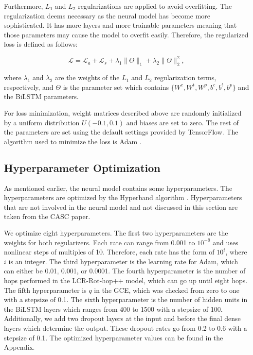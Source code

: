 \documentclass[american, oneside]{ecsgdp}
\begin{document}
Furthermore, $L_1$ and $L_2$ regularizations are applied to avoid overfitting. The regularization deems necessary as the neural model has become more sophisticated. It has more layers and more trainable parameters meaning that those parameters may cause the model to overfit easily. Therefore, the regularized loss is defined as follows:

\begin{equation}
    \mathcal{L} = \mathcal{L}_a + \mathcal{L}_s + \lambda_1 \|\Theta\|_1 + \lambda_2  \|\Theta\|^2_2,
\end{equation}

\noindent where $\lambda_1$ and $\lambda_2$ are the weights of the $L_1$ and $L_2$ regularization terms, respectively, and $\Theta$ is the parameter set which contains $\{W^c, W^t, W^p, b^c, b^t, b^p\}$ and the BiLSTM parameters.

For loss minimization, weight matrices described above are randomly initialized by a uniform distribution $U(-0.1, 0.1)$ and biases are set to zero. The rest of the parameters are set using the default settings provided by TensorFlow. The algorithm used to minimize the loss is Adam \parencite{Kingma2017Adam}. %

\subsection{Hyperparameter Optimization} \label{sec:hypertune}
As mentioned earlier, the neural model contains some hyperparameters. The hyperparameters are optimized by the Hyperband algorithm \parencite{Li2018Hyperband}. %
Hyperparameters that are not involved in the neural model and not discussed in this section are taken from the CASC \parencite{Kumar2021CASC} paper.

We optimize eight hyperparameters. The first two hyperparameters are the weights for both regularizers. Each rate can range from 0.001 to $10^{-9}$ and uses nonlinear steps of multiples of 10. Therefore, each rate has the form of $10^{i}$, where $i$ is an integer. The third hyperparameter is the learning rate for Adam, which can either be 0.01, 0.001, or 0.0001. The fourth hyperparameter is the number of hops performed in the LCR-Rot-hop++ model, which can go up until eight hops. The fifth hyperparameter is $q$ in the GCE, which was checked from zero to one with a stepsize of 0.1. The sixth hyperparameter is the number of hidden units in the BiLSTM layers which ranges from  400 to 1500 with a stepsize of 100. Additionally, we add two dropout layers at the input and before the final dense layers which determine the output. These dropout rates go from 0.2 to 0.6 with a stepsize of 0.1. The optimized hyperparameter values can be found in the Appendix.
\end{document}
